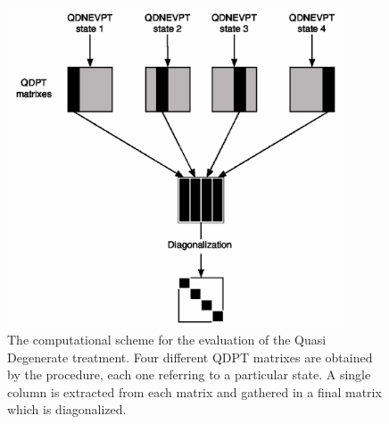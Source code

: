 \begin{center}
\begin{figure}[ht]
\begin{center}
\includegraphics[width=10cm]{03_nevpt/images/qdpt_diagram-gimped.eps}
\end{center}
\caption{\footnotesize The computational scheme for the evaluation of the
Quasi Degenerate treatment. Four different QDPT matrixes are obtained by the
procedure, each one referring to a particular state. A single column is
extracted from each matrix and gathered in a final matrix which is
diagonalized. }
\label{fig:qdpt_diagram}
\end{figure}
\end{center}
